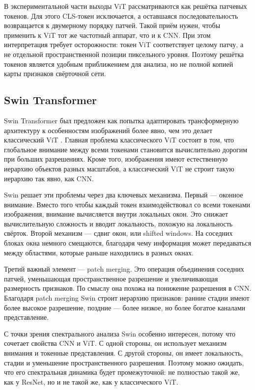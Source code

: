 В экспериментальной части выходы ViT рассматриваются как решётка патчевых токенов. Для этого CLS-токен исключается, а оставшаяся последовательность возвращается к двумерному порядку патчей. Такой приём нужен, чтобы применить к ViT тот же частотный аппарат, что и к CNN. При этом интерпретация требует осторожности: токен ViT соответствует целому патчу, а не отдельной пространственной позиции пиксельного уровня. Поэтому решётка токенов является удобным приближением для анализа, но не полной копией карты признаков свёрточной сети.

\subsection{Swin Transformer}

Swin Transformer был предложен как попытка адаптировать трансформерную архитектуру к особенностям изображений более явно, чем это делает классический ViT \cite{liu2021swin}. Главная проблема классического ViT состоит в том, что глобальное внимание между всеми токенами становится вычислительно дорогим при больших разрешениях. Кроме того, изображения имеют естественную иерархию объектов разных масштабов, а классический ViT не строит такую иерархию так явно, как CNN.

Swin решает эти проблемы через два ключевых механизма. Первый — оконное внимание. Вместо того чтобы каждый токен взаимодействовал со всеми токенами изображения, внимание вычисляется внутри локальных окон. Это снижает вычислительную сложность и вводит локальность, похожую на локальность свёрток. Второй механизм — сдвиг окон, или shifted windows. На соседних блоках окна немного смещаются, благодаря чему информация может передаваться между областями, которые раньше находились в разных окнах.

Третий важный элемент — patch merging. Это операция объединения соседних патчей, уменьшающая пространственное разрешение и увеличивающая размерность признаков. По смыслу она похожа на понижение разрешения в CNN. Благодаря patch merging Swin строит иерархию признаков: ранние стадии имеют более высокое разрешение, поздние — более низкое, но более богатое каналами представление.

С точки зрения спектрального анализа Swin особенно интересен, потому что сочетает свойства CNN и ViT. С одной стороны, он использует механизм внимания и токенные представления. С другой стороны, он имеет локальность, стадии и уменьшение пространственного разрешения. Поэтому можно ожидать, что его спектральная динамика будет промежуточной: не полностью такой же, как у ResNet, но и не такой же, как у классического ViT.

